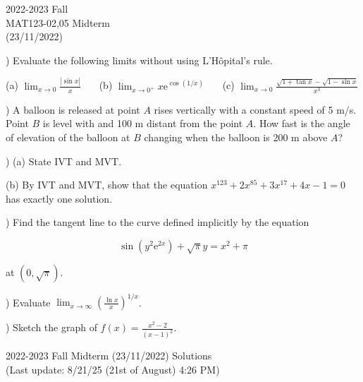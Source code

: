 \documentclass{article}
\begin{document}
\pagestyle{empty}
\large

\begin{center}
2022-2023 Fall \\MAT123-02,05 Midterm\\(23/11/2022)
\end{center}

) Evaluate the following limits without using L'Hôpital's rule.

\hfill

(a) $\displaystyle \lim_{x\to 0} \frac{\left|\sin x\right|}{x}$ \ \ \ (b) $\displaystyle \lim_{x\to 0^+}x\mathrm{e}^{\displaystyle \cos(1/x)}$ \ \ \ (c) $\displaystyle \lim_{x\to 0}{\frac{\sqrt{1+\tan x} -\sqrt{1-\sin x} }{x^3}}$

\hfill

) A balloon is released at point $A$ rises vertically with a constant speed of 5 m/s. Point $B$ is level with and 100 m distant from the point $A$. How fast is the angle of elevation of the balloon at $B$ changing when the balloon is 200 m above $A$?

\hfill

) (a) State IVT and MVT.

\hfill

\noindent (b) By IVT and MVT, show that the equation $x^{123}+2x^{85} + 3x^{17} + 4x-1 = 0$ has exactly one solution.

\hfill

) Find the tangent line to the curve defined implicitly by the equation

\begin{equation*}
\sin\left(y^2\mathrm{e}^{2x}\right) + \sqrt{\pi}y = x^2 + \pi
\end{equation*}

\noindent at $(0, \sqrt\pi).$

\hfill

) Evaluate $\displaystyle \lim_{x \to \infty} \left(\frac{\ln x}{x}\right)^{1/x}$.

\hfill

) Sketch the graph of $\displaystyle f(x) = \frac{x^2-2}{(x-1)^2}$.

\newpage

\begin{center}
2022-2023 Fall Midterm (23/11/2022) Solutions\\
(Last update: 8/21/25 (21st of August) 4:26 PM)
\end{center}
\end{document}
